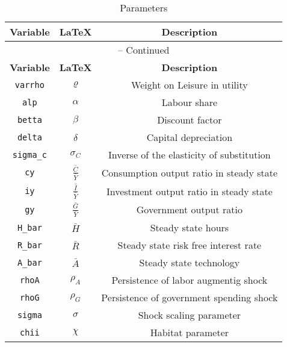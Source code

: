 \begin{center}
\begin{longtable}{ccc}
\caption{Parameters}\\%
\hline%
\multicolumn{1}{c}{\textbf{Variable}} &
\multicolumn{1}{c}{\textbf{\LaTeX}} &
\multicolumn{1}{c}{\textbf{Description}}\\%
\hline\hline%
\endfirsthead
\multicolumn{3}{c}{{\tablename} \thetable{} -- Continued}\\%
\hline%
\multicolumn{1}{c}{\textbf{Variable}} &
\multicolumn{1}{c}{\textbf{\LaTeX}} &
\multicolumn{1}{c}{\textbf{Description}}\\%
\hline\hline%
\endhead
\texttt{varrho} & ${\varrho}$ & Weight on Leisure in utility\\
\texttt{alp} & ${\alpha}$ & Labour share\\
\texttt{betta} & ${\beta}$ & Discount factor\\
\texttt{delta} & ${\delta}$ & Capital depreciation\\
\texttt{sigma\_c} & ${\sigma_{C}}$ & Inverse of the elasticity of substitution\\
\texttt{cy} & $\frac{\bar{C}}{\bar{Y}}$ & Consumption output ratio in steady state\\
\texttt{iy} & $\frac{\bar{I}}{\bar{Y}}$ & Investment output ratio in steady state\\
\texttt{gy} & $\frac{\bar{G}}{\bar{Y}}$ & Government output ratio\\
\texttt{H\_bar} & $\bar{H}$ & Steady state hours\\
\texttt{R\_bar} & $\bar{R}$ & Steady state risk free interest rate\\
\texttt{A\_bar} & $\bar{A}$ & Steady state technology\\
\texttt{rhoA} & ${\rho_{A}}$ & Persistence of labor augmentig shock\\
\texttt{rhoG} & ${\rho_{G}}$ & Persistence of government spending shock\\
\texttt{sigma} & ${\sigma}$ & Shock scaling parameter\\
\texttt{chii} & ${\chi}$ & Habitat parameter\\
\hline%
\end{longtable}
\end{center}
